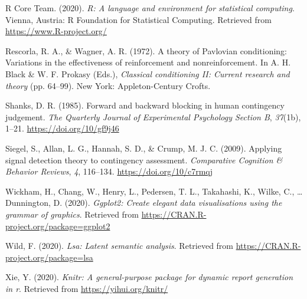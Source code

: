 \documentclass[
  english,
  man,floatsintext]{apa6}
\begin{document}
\leavevmode\hypertarget{ref-R-base}{}%
R Core Team. (2020). \emph{R: A language and environment for statistical computing}. Vienna, Austria: R Foundation for Statistical Computing. Retrieved from \url{https://www.R-project.org/}

\leavevmode\hypertarget{ref-rescorlaTheoryPavlovianConditioning1972}{}%
Rescorla, R. A., \& Wagner, A. R. (1972). A theory of Pavlovian conditioning: Variations in the effectiveness of reinforcement and nonreinforcement. In A. H. Black \& W. F. Prokasy (Eds.), \emph{Classical conditioning II: Current research and theory} (pp. 64--99). New York: Appleton-Century Crofts.

\leavevmode\hypertarget{ref-shanksForwardBackwardBlocking1985}{}%
Shanks, D. R. (1985). Forward and backward blocking in human contingency judgement. \emph{The Quarterly Journal of Experimental Psychology Section B}, \emph{37}(1b), 1--21. \url{https://doi.org/10/gf9j46}

\leavevmode\hypertarget{ref-siegelApplyingSignalDetection2009}{}%
Siegel, S., Allan, L. G., Hannah, S. D., \& Crump, M. J. C. (2009). Applying signal detection theory to contingency assessment. \emph{Comparative Cognition \& Behavior Reviews}, \emph{4}, 116--134. \url{https://doi.org/10/c7rmqj}

\leavevmode\hypertarget{ref-R-ggplot2}{}%
Wickham, H., Chang, W., Henry, L., Pedersen, T. L., Takahashi, K., Wilke, C., \ldots{} Dunnington, D. (2020). \emph{Ggplot2: Create elegant data visualisations using the grammar of graphics}. Retrieved from \url{https://CRAN.R-project.org/package=ggplot2}

\leavevmode\hypertarget{ref-R-lsa}{}%
Wild, F. (2020). \emph{Lsa: Latent semantic analysis}. Retrieved from \url{https://CRAN.R-project.org/package=lsa}

\leavevmode\hypertarget{ref-R-knitr}{}%
Xie, Y. (2020). \emph{Knitr: A general-purpose package for dynamic report generation in r}. Retrieved from \url{https://yihui.org/knitr/}

\endgroup


\clearpage
\makeatletter
\efloat@restorefloats
\makeatother
\end{document}
